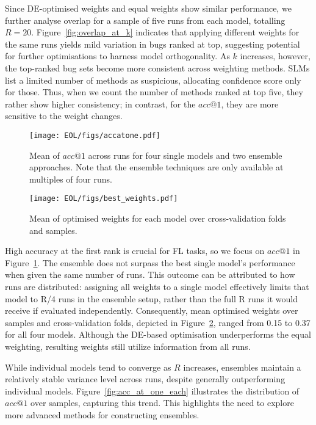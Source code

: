 Since DE-optimised weights and equal weights show similar performance, we further analyse overlap for a sample of five runs from each model, totalling $R=20$. Figure~\ref{fig:overlap_at_k} indicates that applying different weights for the same runs yields mild variation in bugs ranked at top, suggesting potential for further optimisations to harness model orthogonality. As $k$ increases, however, the top-ranked bug sets become more consistent across weighting methods. SLMs list a limited number of methods as suspicious, allocating confidence score only for those. Thus, when we count the number of methods ranked at top five, they rather show higher consistency; in contrast, for the $acc@1$, they are more sensitive to the weight changes.

\begin{figure}[htbp]
\centerline{\texttt{[image: EOL/figs/accatone.pdf]}}
\caption{Mean of $acc@1$ across runs for four single models and two ensemble approaches. Note that the ensemble techniques are only available at multiples of four runs.}
\label{fig:acc_at_one_all}
\end{figure}

\begin{figure}[htbp]
\centerline{\texttt{[image: EOL/figs/best\_weights.pdf]}}
\caption{Mean of optimised weights for each model over cross-validation folds and samples.}
\label{fig:mean_best_weights}
\end{figure}

High accuracy at the first rank is crucial for FL tasks, so we focus on $acc@1$ in Figure~\ref{fig:acc_at_one_all}. The ensemble does not surpass the best single model’s performance when given the same number of runs. This outcome can be attributed to how runs are distributed: assigning all weights to a single model effectively limits that model to R/4 runs in the ensemble setup, rather than the full R runs it would receive if evaluated independently. Consequently, mean optimised weights over samples and cross-validation folds, depicted in Figure~\ref{fig:mean_best_weights}, ranged from 0.15 to 0.37 for all four models. Although the DE-based optimisation underperforms the equal weighting, resulting weights still utilize information from all runs.

While individual models tend to converge as $R$ increases, ensembles maintain a relatively stable variance level across runs, despite generally outperforming individual models. Figure~\ref{fig:acc_at_one_each} illustrates the distribution of $acc@1$ over samples, capturing this trend. This highlights the need to explore more advanced methods for constructing ensembles.

